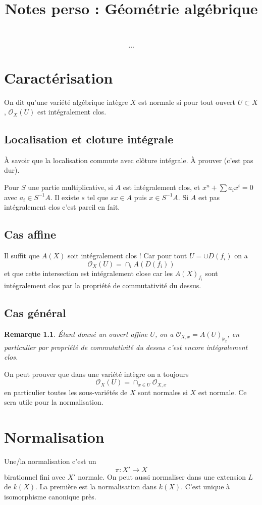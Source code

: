 \documentclass[a4paper,12pt]{book}
\title{Notes perso : Géométrie algébrique}
\date{}
\newcommand{\Or}{\mathcal{O}}
\newcommand{\p}{\mathfrak{p}}
\theoremstyle{plain}
\newtheorem{rem}{Remarque}
\theoremstyle{definition}
\theoremstyle{remark}
\begin{document}
\maketitle
\tableofcontents
\[\ldots\]   
\chapter{Caractérisation}
On dit qu'une variété algébrique intègre $X$ est normale si pour
tout ouvert $U\subset X$, $\Or_X(U)$ est intégralement clos.
\section{Localisation et cloture intégrale}
À savoir que la localisation commute avec clôture intégrale.
À prouver (c'est pas dur).

Pour $S$ une partie multiplicative, si $A$ est intégralement clos,
et $x^n+\sum a_i x^i=0$ avec $a_i\in S^{-1}A$. Il existe $s$ tel
que $sx\in A$ puis $x\in S^{-1}A$. Si $A$ est pas intégralement
clos c'est pareil en fait.

\section{Cas affine}
Il suffit que $A(X)$ soit intégralement clos ! Car pour tout 
$U=\cup D(f_i)$ on a \[\Or_X(U)=\cap_i A(D(f_i))\]
et que cette intersection est intégralement close car les
$A(X)_{f_i}$ sont intégralement clos par la propriété de 
commutativité du dessus.

\section{Cas général}
\begin{rem}
    Étant donné un ouvert affine $U$, on a $\Or_{X,x}=A(U)_{\p_x}$,
    en particulier par propriété de commutativité du dessus
    c'est encore intégralement clos.
\end{rem}
On peut prouver que dans une variété intègre on a toujours
\[\Or_X(U)=\cap_{x\in U} \Or_{X,x}\]
en particulier toutes les sous-variétés de $X$ sont normales si
$X$ est normale. Ce sera utile pour la normalisation.

\chapter{Normalisation}
Une/la normalisation c'est un 
\[\pi\colon X'\to X\]
birationnel fini avec $X'$ normale. On peut aussi normaliser dans 
une extension $L$ de $k(X)$. La première est la normalisation
dans $k(X)$. C'est unique à isomorphisme canonique près.
\end{document}
